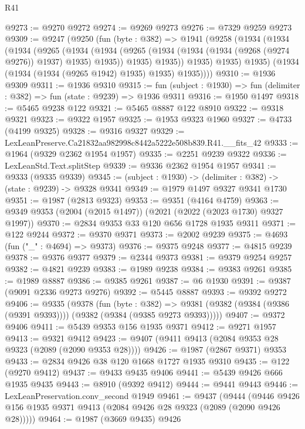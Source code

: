 \begin{lexlean}{R41}
\begin{coremodule}
@9273 := @9270 @9272
@9274 := @9269 @9273
@9276 := @7329 @9259 @9273
@9309 := @9247
    (@9250
      (fun (byte : @382) =>
      @1941
        (@9258
          (@1934
            (@1934
              (@1934
                (@9265
                  (@1934
                    (@1934
                      (@9265 (@1934 (@1934 (@1934 (@9268 (@9274 @9276)) @1937) @1935) @1935))
                      @1935)
                    @1935))
                @1935)
              @1935)
            @1935)
          (@1934 (@1934 (@1934 (@9265 @1942) @1935) @1935) @1935))))
@9310 := @1936 @9309
@9311 := @1936 @9310
@9315 := fun (subject : @1930) => fun (delimiter : @382) => fun (state : @9239) => @1936 @9311
@9316 := @1950 @1497
@9318 := @5465 @9238 @122
@9321 := @5465 @8887 @122 @8910
@9322 := @9318 @9321
@9323 := @9322 @1957
@9325 := @1953 @9323 @1960
@9327 := @4733 (@4199 @9325)
@9328 := @9316 @9327
@9329 := LexLeanPreserve.Ca21832aa982998c8442a5222e508b839.R41.__fits_42
@9333 := @1964 (@9329 @2362 @1954 @1957)
@9335 := @2251 @9239 @9322
@9336 := LexLeanStd.Text.splitStep
@9339 := @9336 @2362 @1954 @1957
@9341 := @9333 (@9335 @9339)
@9345 := (subject : @1930) -> (delimiter : @382) -> (state : @9239) -> @9328 @9341
@9349 := @1979 @1497 @9327 @9341 @1730
@9351 := @1987 (@2813 @9323)
@9353 := @9351 (@4164 @4759)
@9363 := @9349 @9353 (@2004 (@2015 @1497)) (@2021 (@2022 (@2023 @1730) @9327 @1997))
@9370 := @2834 @9353 @33 @120 @656 @1728 @1935 @9311
@9371 := @122 @9244
@9372 := @9370 @9371
@9373 := @2002 @9239
@9375 := @4693 (fun ("_" : @4694) => @9373)
@9376 := @9375 @9248
@9377 := @4815 @9239
@9378 := @9376 @9377
@9379 := @2344 @9373
@9381 := @9379 @9254 @9257
@9382 := @4821 @9239
@9383 := @1989 @9238
@9384 := @9383 @9261
@9385 := @1989 @8887
@9386 := @9385 @9261
@9387 := @6 @1930
@9391 := @9387 (@9091 @2336 @9273 @9276)
@9392 := @5445 @8887
@9393 := @9392 @9272
@9406 := @9335
    (@9378
      (fun (byte : @382) =>
      @9381 (@9382 (@9384 (@9386 (@9391 @9393)))) (@9382 (@9384 (@9385 @9273 @9393)))))
@9407 := @9372 @9406
@9411 := @5439 @9353 @156 @1935 @9371
@9412 := @9271 @1957
@9413 := @9321 @9412
@9423 := @9407 (@9411 @9413 (@2084 @9353 @28 @9323 (@2089 (@2090 @9353 @28))))
@9426 := @1987 (@2867 @9371) @9353
@9433 := @2834 @9426 @38 @120 @1668 @1727 @1935 @9310
@9435 := @122 (@9270 @9412)
@9437 := @9433 @9435 @9406
@9441 := @5439 @9426 @666 @1935 @9435
@9443 := @8910 (@9392 @9412)
@9444 := @9441 @9443
@9446 := LexLeanPreservation.conv_second @1949
@9461 := @9437
    (@9444 (@9446 @9426 @156 @1935 @9371 @9413 (@2084 @9426 @28 @9323 (@2089 (@2090 @9426 @28)))))
@9464 := @1987 (@3669 @9435) @9426

\end{coremodule}
\end{lexlean}
